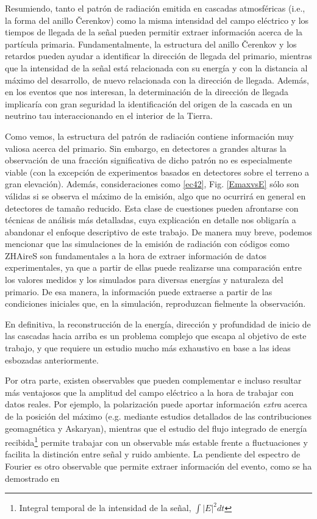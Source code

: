 \documentclass[11 pt, a4paper]{article} %
\numberwithin{equation}{section}
\numberwithin{figure}{section}
\numberwithin{table}{section}
\begin{document}
Resumiendo, tanto el patrón de radiación emitida en cascadas atmosféricas (i.e., la forma del anillo \v{C}erenkov) como la misma intensidad del campo eléctrico y los tiempos de llegada de la señal pueden permitir extraer información acerca de la partícula primaria. Fundamentalmente, la estructura del anillo \v{C}erenkov y los retardos pueden ayudar a identificar la dirección de llegada del primario, mientras que la intensidad de la señal está relacionada con su energía y con la distancia al máximo del desarrollo, de nuevo relacionada con la dirección de llegada. Además, en los eventos que nos interesan, la determinación de la dirección de llegada implicaría con gran seguridad la identificación del origen de la cascada en un neutrino tau interaccionando en el interior de la Tierra.

Como vemos, la estructura del patrón de radiación contiene información muy valiosa acerca del primario. Sin embargo, en detectores a grandes alturas la observación de una fracción significativa de dicho patrón no es especialmente viable (con la excepción de experimentos basados en detectores sobre el terreno a gran elevación). Además, consideraciones como \eqref{ec42}, Fig. \ref{EmaxvsE} sólo son válidas si se observa el máximo de la emisión, algo que no ocurrirá en general en detectores de tamaño reducido. Esta clase de cuestiones pueden afrontarse con técnicas de análisis más detalladas, cuya explicación en detalle nos obligaría a abandonar el enfoque descriptivo de este trabajo. De manera muy breve, podemos mencionar que las simulaciones de la emisión de radiación con códigos como ZHAireS son fundamentales a la hora de extraer información de datos experimentales, ya que a partir de ellas puede realizarse una comparación entre los valores medidos y los simulados para diversas energías y naturaleza del primario. De esa manera, la información puede extraerse a partir de las condiciones iniciales que, en la simulación, reproduzcan fielmente la observación.

En definitiva, la reconstrucción de la energía, dirección y profundidad de inicio de las cascadas hacia arriba es un problema complejo que escapa al objetivo de este trabajo, y que requiere un estudio mucho más exhaustivo en base a las ideas esbozadas anteriormente.

Por otra parte, existen observables que pueden complementar e incluso resultar más ventajosos que la amplitud del campo eléctrico a la hora de trabajar con datos reales. Por ejemplo, la polarización puede aportar información \textit{extra} acerca de la posición del máximo (e.g. mediante estudios detallados de las contribuciones geomagnética y Askaryan), mientras que el estudio del flujo integrado de energía recibida\footnote{ Integral temporal de la intensidad de la señal, $\int\left|E\right|^2dt$} permite trabajar con un observable más estable frente a fluctuaciones y facilita la distinción entre señal y ruido ambiente. La pendiente del espectro de Fourier es otro observable que permite extraer información del evento, como se ha demostrado en \cite{schoorlemmer2016energy}
\end{document}
